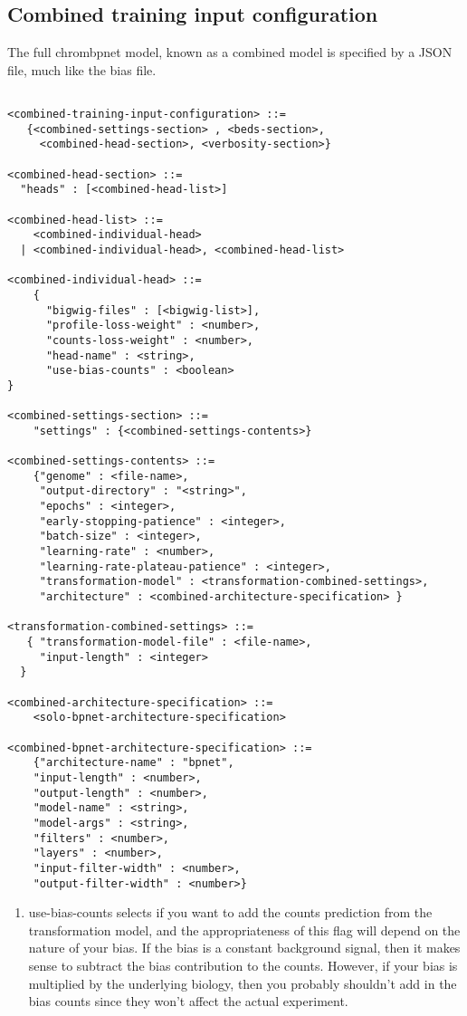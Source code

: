 \documentclass{article}
\begin{document}
\subsection{Combined training input configuration}
The full chrombpnet model, known as a combined model is specified by a JSON file, 
much like the bias file.

\begin{lstlisting}

<combined-training-input-configuration> ::= 
   {<combined-settings-section> , <beds-section>, 
     <combined-head-section>, <verbosity-section>}

<combined-head-section> ::= 
  "heads" : [<combined-head-list>]

<combined-head-list> ::= 
    <combined-individual-head>
  | <combined-individual-head>, <combined-head-list>

<combined-individual-head> ::=
    {
      "bigwig-files" : [<bigwig-list>],
      "profile-loss-weight" : <number>,
      "counts-loss-weight" : <number>,
      "head-name" : <string>,
      "use-bias-counts" : <boolean>
}

<combined-settings-section> ::= 
    "settings" : {<combined-settings-contents>}

<combined-settings-contents> ::= 
    {"genome" : <file-name>, 
     "output-directory" : "<string>",
     "epochs" : <integer>, 
     "early-stopping-patience" : <integer>, 
     "batch-size" : <integer>, 
     "learning-rate" : <number>, 
     "learning-rate-plateau-patience" : <integer>,
     "transformation-model" : <transformation-combined-settings>,
     "architecture" : <combined-architecture-specification> } 

<transformation-combined-settings> ::= 
   { "transformation-model-file" : <file-name>, 
     "input-length" : <integer>
  }

<combined-architecture-specification> ::= 
    <solo-bpnet-architecture-specification>

<combined-bpnet-architecture-specification> ::= 
    {"architecture-name" : "bpnet",
    "input-length" : <number>, 
    "output-length" : <number>,
    "model-name" : <string>,
    "model-args" : <string>,
    "filters" : <number>,
    "layers" : <number>,
    "input-filter-width" : <number>,
    "output-filter-width" : <number>}
\end{lstlisting}

\begin{enumerate}
    \item use-bias-counts selects if you want to add the counts prediction from the transformation model, and the appropriateness of this flag will depend on the nature of your bias. If the bias is a constant background signal, then it makes sense to subtract the bias contribution to the counts. However, if your bias is multiplied by the underlying biology, then you probably shouldn't add in the bias counts since they won't affect the actual experiment. 
\end{enumerate}
\end{document}
